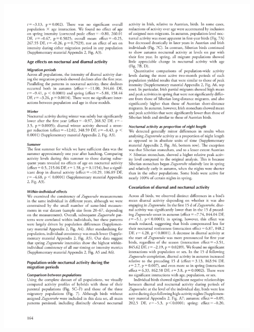 \documentclass[a4paper, twoside]{templates/ociamthesis}
\begin{document}
\begin{center}\includegraphics[width=1\linewidth]{pdf_chapters/zug/zug_crop_Part10} \end{center}
\end{document}
